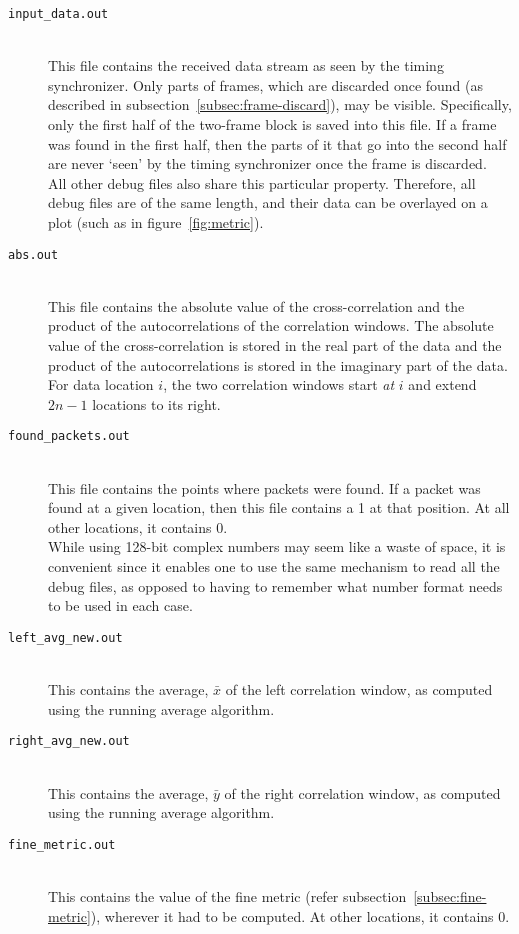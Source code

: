 \begin{description}
	\item[\texttt{input\_data.out}] \hfill \\
		This file contains the received data stream as seen by the timing
		synchronizer. Only parts of frames, which are discarded once found (as
		described in subsection~\ref{subsec:frame-discard}), may be visible.
		Specifically, only the first half of the two-frame block is saved into
		this file. If a frame was found in the first half, then the parts of it
		that go into the second half are never `seen' by the timing
		synchronizer once the frame is discarded. \\
		All other debug files also share this particular property. Therefore,
		all debug files are of the same length, and their data can be overlayed
		on a plot (such as in figure~\ref{fig:metric}).
	\item[\texttt{abs.out}] \hfill \\
		This file contains the absolute value of the cross-correlation and the
		product of the autocorrelations of the correlation windows. The
		absolute value of the cross-correlation is stored in the real part of
		the data and the product of the autocorrelations is stored in the
		imaginary part of the data. For data location $i$, the two correlation
		windows start \emph{at} $i$ and extend $2n-1$ locations to its right.
	\item[\texttt{found\_packets.out}] \hfill \\
		This file contains the points where packets were found. If a packet
		was found at a given location, then this file contains a 1 at that
		position. At all other locations, it contains 0. \\
		While using 128-bit complex numbers may seem like a waste of space, it
		is convenient since it enables one to use the same mechanism to read
		all the debug files, as opposed to having to remember what number
		format needs to be used in each case.
	\item[\texttt{left\_avg\_new.out}] \hfill \\
		This contains the average, $\bar{x}$ of the left correlation window, as
		computed using the running average algorithm.
	\item[\texttt{right\_avg\_new.out}] \hfill \\
		This contains the average, $\bar{y}$ of the right correlation window,
		as computed using the running average algorithm.
	\item[\texttt{fine\_metric.out}] \hfill \\
		This contains the value of the fine metric (refer
		subsection~\ref{subsec:fine-metric}), wherever it had to be computed.
		At other locations, it contains 0.
\end{description}

